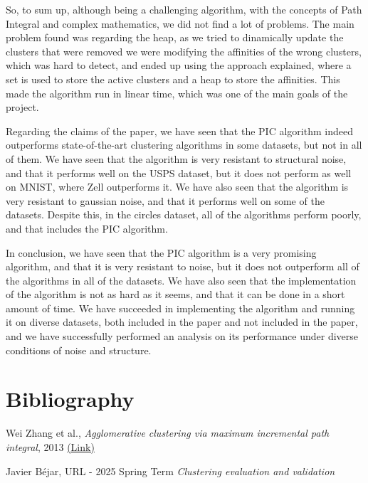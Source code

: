 \documentclass[
	10pt,
	parskip=half-,	
	paper=a4,
	english
	]{scrartcl}
\begin{document}
So, to sum up, although being a challenging algorithm, with the concepts of Path Integral and complex mathematics, we did not find a lot of problems. The main problem  found was regarding the heap, as we tried to dinamically update the clusters that were removed we were modifying the affinities of the wrong clusters, which was hard to detect, and ended up using the approach explained, where a set is used to store the active clusters and a heap to store the affinities. This made the algorithm run in linear time, which was one of the main goals of the project.

Regarding the claims of the paper, we have seen that the PIC algorithm indeed outperforms state-of-the-art clustering algorithms in some datasets, but not in all of them. We have seen that the algorithm is very resistant to structural noise, and that it performs well on the USPS dataset, but it does not perform as well on MNIST, where Zell outperforms it. We have also seen that the algorithm is very resistant to gaussian noise, and that it performs well on some of the datasets. Despite this, in the circles dataset, all of the algorithms perform poorly, and that includes the PIC algorithm.

In conclusion, we have seen that the PIC algorithm is a very promising algorithm, and that it is very resistant to noise, but it does not outperform all of the algorithms in all of the datasets. We have also seen that the implementation of the algorithm is not as hard as it seems, and that it can be done in a short amount of time. We have succeeded in implementing the algorithm and running it on diverse datasets, both included in the paper and not included in the paper, and we have successfully performed an analysis on its performance under diverse conditions of noise and structure.


\newpage
\section{Bibliography}

\renewcommand{\section}[2]{}%
\begin{thebibliography}{9}

Wei Zhang et al.,
\textit{Agglomerative clustering via maximum incremental path integral}, 2013
\href{https://www.sciencedirect.com/science/article/pii/S0031320313001830}{(Link)}

Javier Béjar,
URL - 2025 Spring Term
\textit{Clustering evaluation and validation}

\end{thebibliography}
\end{document}
